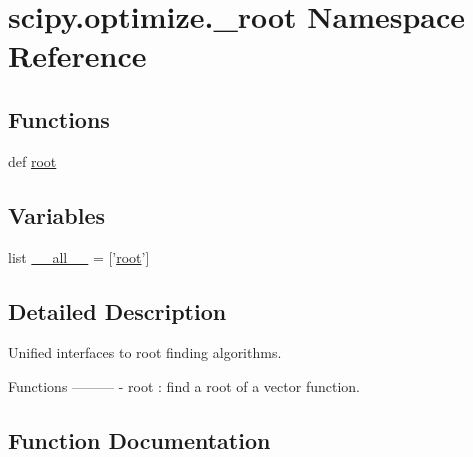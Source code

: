 \hypertarget{namespacescipy_1_1optimize_1_1__root}{}\section{scipy.\+optimize.\+\_\+root Namespace Reference}
\label{namespacescipy_1_1optimize_1_1__root}
\subsection*{Functions}
\begin{DoxyCompactItemize}
\item 
def \hyperlink{namespacescipy_1_1optimize_1_1__root_a5aae377ecdbb3d67385ba02eb46bd796}{root}
\end{DoxyCompactItemize}
\subsection*{Variables}
\begin{DoxyCompactItemize}
\item 
list \hyperlink{namespacescipy_1_1optimize_1_1__root_a172eef1e96392775fe745d3dd3732d55}{\+\_\+\+\_\+all\+\_\+\+\_\+} = \mbox{[}'\hyperlink{namespacescipy_1_1optimize_1_1__root_a5aae377ecdbb3d67385ba02eb46bd796}{root}'\mbox{]}
\end{DoxyCompactItemize}


\subsection{Detailed Description}
\begin{DoxyVerb}Unified interfaces to root finding algorithms.

Functions
---------
- root : find a root of a vector function.
\end{DoxyVerb}
 

\subsection{Function Documentation}
\hypertarget{namespacescipy_1_1optimize_1_1__root_a5aae377ecdbb3d67385ba02eb46bd796}{}
